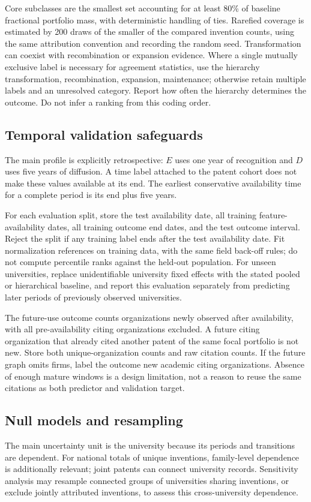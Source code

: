 Core subclasses are the smallest set accounting for at least 80\% of baseline
fractional portfolio mass, with deterministic handling of ties. Rarefied coverage
is estimated by 200 draws of the smaller of the compared invention counts,
using the same attribution convention and recording the random seed. Transformation
can coexist with recombination or expansion evidence. Where a single mutually
exclusive label is necessary for agreement statistics, use the hierarchy
transformation, recombination, expansion, maintenance; otherwise retain multiple
labels and an unresolved category. Report how often the hierarchy determines
the outcome. Do not infer a ranking from this coding order.

\subsection{Temporal validation safeguards}
The main profile is explicitly retrospective: $E$ uses one year of recognition
and $D$ uses five years of diffusion. A time label attached to the patent cohort
does not make these values available at its end. The earliest conservative
availability time for a complete period is its end plus five years.

For each evaluation split, store the test availability date, all training
feature-availability dates, all training outcome end dates, and the test outcome
interval. Reject the split if any training label ends after the test availability
date. Fit normalization references on training data, with the same field back-off
rules; do not compute percentile ranks against the held-out population.
For unseen universities, replace unidentifiable university fixed effects with
the stated pooled or hierarchical baseline, and report this evaluation separately
from predicting later periods of previously observed universities.

The future-use outcome counts organizations newly observed after availability,
with all pre-availability citing organizations excluded. A future citing
organization that already cited another patent of the same focal portfolio is
not new. Store both unique-organization counts and raw citation counts. If the
future graph omits firms, label the outcome new academic citing organizations.
Absence of enough mature windows is a design limitation, not a reason to reuse
the same citations as both predictor and validation target.

\subsection{Null models and resampling}
The main uncertainty unit is the university because its periods and transitions
are dependent. For national totals of unique inventions, family-level dependence
is additionally relevant; joint patents can connect university records. Sensitivity
analysis may resample connected groups of universities sharing inventions, or
exclude jointly attributed inventions, to assess this cross-university dependence.


